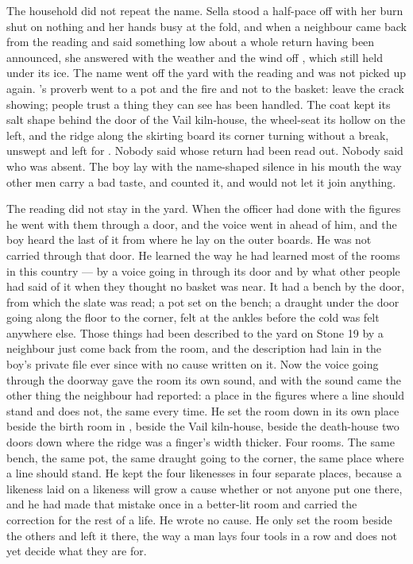 The household did not repeat the name. Sella stood a half-pace off with her burn shut on nothing and her hands busy at the fold, and when a neighbour came back from the reading and said something low about a whole return having been announced, she answered with the weather and the wind off , which still held under its ice. The name went off the yard with the reading and was not picked up again. 's proverb went to a pot and the fire and not to the basket: leave the crack showing; people trust a thing they can see has been handled. The coat kept its salt shape behind the door of the Vail kiln-house, the wheel-seat its hollow on the left, and the ridge along the skirting board its corner turning without a break, unswept and left for . Nobody said whose return had been read out. Nobody said who was absent. The boy lay with the name-shaped silence in his mouth the way other men carry a bad taste, and counted it, and would not let it join anything.

\scenebreak

The reading did not stay in the yard. When the officer had done with the figures he went with them through a door, and the voice went in ahead of him, and the boy heard the last of it from where he lay on the outer boards. He was not carried through that door. He learned  the way he had learned most of the rooms in this country --- by a voice going in through its door and by what other people had said of it when they thought no basket was near. It had a bench by the door, from which the slate was read; a pot set on the bench; a draught under the door going along the floor to the corner, felt at the ankles before the cold was felt anywhere else. Those things had been described to the yard on Stone 19 by a neighbour just come back from the room, and the description had lain in the boy's private file ever since with no cause written on it. Now the voice going through the doorway gave the room its own sound, and with the sound came the other thing the neighbour had reported: a place in the figures where a line should stand and does not, the same every time. He set the room down in its own place beside the birth room in , beside the Vail kiln-house, beside the death-house two doors down where the ridge was a finger's width thicker. Four rooms. The same bench, the same pot, the same draught going to the corner, the same place where a line should stand. He kept the four likenesses in four separate places, because a likeness laid on a likeness will grow a cause whether or not anyone put one there, and he had made that mistake once in a better-lit room and carried the correction for the rest of a life. He wrote no cause. He only set the room beside the others and left it there, the way a man lays four tools in a row and does not yet decide what they are for.

